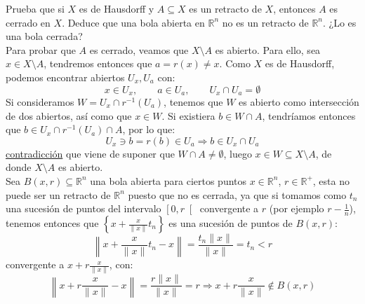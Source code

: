 \begin{ejercicio}
    Prueba que si $X$ es de Hausdorff y $A\subseteq X$ es un retracto de $X$, entonces $A$ es cerrado en $X$. Deduce que una bola abierta en $\mathbb{R}^n$ no es un retracto de $\mathbb{R}^n$. ¿Lo es una bola cerrada?\\

    \noindent
    Para probar que $A$ es cerrado, veamos que $X\setminus A$ es abierto. Para ello, sea $x\in X\setminus A$, tendremos entonces que $a = r(x) \neq x$. Como $X$ es de Hausdorff, podemos encontrar abiertos $U_x, U_a$ con:
    \begin{equation*}
        x\in U_x, \qquad a\in U_a,\qquad U_x\cap U_a = \emptyset 
    \end{equation*}
    Si consideramos $W=U_x\cap r^{-1}(U_a)$, tenemos que $W$ es abierto como intersección de dos abiertos, así como que $x\in W$. Si existiera $b\in W\cap A$, tendríamos entonces que $b\in U_x\cap r^{-1}(U_a)\cap A$, por lo que:
    \begin{equation*}
        U_x\ni b = r(b) \in U_a \Longrightarrow b\in U_x\cap U_a
    \end{equation*}
    \underline{contradicción} que viene de suponer que $W\cap A \neq \emptyset $, luego $x\in W\subseteq X\setminus A$, de donde $X\setminus A$ es abierto.\\

    \noindent
    Sea $B(x,r)\subseteq \mathbb{R}^n$ una bola abierta para ciertos puntos $x\in \mathbb{R}^n$, $r\in \mathbb{R}^+$, esta no puede ser un retracto de $\mathbb{R}^n$ puesto que no es cerrada, ya que si tomamos como $t_n$ una sucesión de puntos del intervalo $\left[0,r\right[$ convergente a $r$ (por ejemplo $r-\frac{1}{n}$), tenemos entonces que $\left\{x+\frac{x}{\|x\|}t_n\right\}$ es una sucesión de puntos de $B(x,r)$:
        \begin{equation*}
            \left\|x+\frac{x}{\|x\|}t_n - x\right\| = \frac{t_n\|x\|}{\|x\|} = t_n < r
        \end{equation*}
        convergente a $x+r\frac{x}{\|x\|}$, con:
        \begin{equation*}
            \left\|x+r\frac{x}{\|x\|}-x\right\| = \frac{r\|x\|}{\|x\|} = r \Longrightarrow x+r\frac{x}{\|x\|}\notin B(x,r)
        \end{equation*}


\end{ejercicio}
